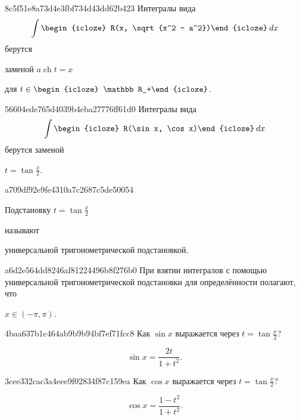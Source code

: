 \begin{note}{8c5f51e8a73d4e3fbf734d43dd62b423}
    Интегралы вида
    \[
        \int \begin{icloze}{2}R(x, \sqrt{x^2 - a^2})\end{icloze}\: dx
    \]
    берутся \begin{icloze}{1}заменой \({ a \operatorname{ch} t = x }\)\end{icloze} для \({ t \in \begin{icloze}{3}\mathbb R_+\end{icloze} }\).
\end{note}

\begin{note}{56604ede765d4039b4eba27776ff61d0}
    Интегралы вида
    \[
        \int \begin{icloze}{2}R(\sin x, \cos x)\end{icloze}\: dx
    \]
    берутся заменой \begin{icloze}{1}\({ t = \tan \frac{x}{2} }\).\end{icloze}
\end{note}

\begin{note}{a709df92e9fe4310a7c2687c5de50054}
    \begin{icloze}{2}Подстановку \({ t = \tan \frac{x}{2} }\)\end{icloze} называют \begin{icloze}{1}универсальной тригонометрической подстановкой.\end{icloze}
\end{note}

\begin{note}{a6d2e564dd8246af81224496b8f276b0}
    При взятии интегралов с помощью универсальной тригонометрической подстановки для определённости полагают, что \begin{icloze}{1}\({ x \in (-\pi, \pi) }\).\end{icloze}
\end{note}

\begin{note}{4baa637b1c464ab9b9b94bf7ef71fcc8}
    Как \({ \sin x }\) выражается через \({ t = \tan \frac{x}{2} }\)?

    \begin{cloze}{1}
        \[
            \sin x =  \frac{2t}{1 + t^2}.
        \]
    \end{cloze}
\end{note}

\begin{note}{3cee332cac3a4eee9f02834f87c159ea}
    Как \({ \cos x }\) выражается через \({ t = \tan \frac{x}{2} }\)?

    \begin{cloze}{1}
        \[
            \cos x = \frac{1 - t^2}{1 + t^2}.
        \]
    \end{cloze}
\end{note}

